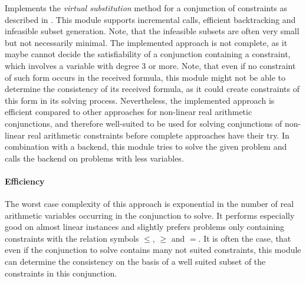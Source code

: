 Implements the \emph{virtual substitution} method for a conjunction of constraints as described in \cite{Article_Corzilius_FCT2011}. This module supports incremental calls, efficient backtracking and infeasible subset generation. Note, that the infeasible subsets are often very small but not necessarily minimal. The implemented approach is not complete, as it maybe cannot decide the satisfiability of a conjunction containing a constraint, which involves a variable with degree $3$ or more. Note, that even if no constraint of such form occurs in the received formula, this module might not be able to determine the consistency of its received formula, as it could create constraints of this form in its solving process. Nevertheless, the implemented approach is efficient compared to other approaches for non-linear real arithmetic conjunctions, and therefore well-suited to be used for solving conjunctions of non-linear real arithmetic constraints before complete approaches have their try. In combination with a backend, this module tries to solve the given problem and calls the backend on problems with less variables.

\paragraph{Efficiency} The worst case complexity of this approach is exponential in the number of real arithmetic variables occurring in the conjunction to solve. It performs especially good on almost linear instances and slightly prefers problems only containing constraints with the relation symbols $\leq$, $\geq$ and $=$. It is often the case, that even if the conjunction to solve contains many not suited constraints, this module can determine the consistency on the basis of a well suited subset of the constraints in this conjunction.